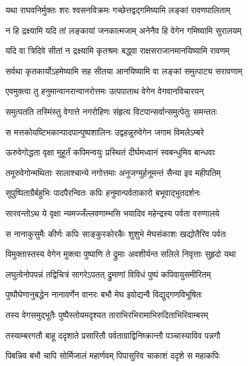 \twolineshloka
{यथा राघवनिर्मुक्तः शरः श्वसनविक्रमः}
{गच्छेत्तद्वद्गमिष्यामि लङ्कां रावणपालिताम्} %

\twolineshloka
{न हि द्रक्ष्यामि यदि तां लङ्कायां जनकात्मजाम्}
{अनेनैव हि वेगेन गमिष्यामि सुरालयम्} %

\twolineshloka
{यदि वा त्रिदिवे सीतां न द्रक्ष्यामि कृतश्रमः}
{बद्ध्वा राक्षसराजानमानयिष्यामि रावणम्} %

\twolineshloka
{सर्वथा कृतकार्योऽहमेष्यामि सह सीतया}
{आनयिष्यामि वा लङ्कां समुत्पाट्य सरावणाम्} %

\twolineshloka
{एवमुक्त्वा तु हनुमान्वानरान्वानरोत्तमः}
{उत्पपाताथ वेगेन वेगवानविचारयन्} %

\twolineshloka
{समुत्पतति तस्मिंस्तु वेगात्ते नगरोहिणः}
{संहृत्य विटपान्सर्वान्समुत्पेतुः समन्ततः} %

\twolineshloka
{स मत्तकोयष्टिभकान्पादपान्पुष्पशालिनः}
{उद्वहन्नूरुवेगेन जगाम विमलेऽम्बरे} %

\twolineshloka
{ऊरुवेगोद्धता वृक्षा मुहूर्तं कपिमन्वयुः}
{प्रस्थितं दीर्घमध्वानं स्वबन्धुमिव बान्धवाः} %

\twolineshloka
{तमूरुवेगोन्मथिताः सालाश्चान्ये नगोत्तमाः}
{अनुजग्मुर्हनूमन्तं सैन्या इव महीपतिम्} %

\twolineshloka
{सुपुष्पिताग्रैर्बहुभिः पादपैरन्वितः कपिः}
{हनुमान्पर्वताकारो बभूवाद्भुतदर्शनः} %

\twolineshloka
{सारवन्तोऽथ ये वृक्षा न्यमज्जँल्लवणाम्भसि}
{भयादिव महेन्द्रस्य पर्वता वरुणालये} %

\twolineshloka
{स नानाकुसुमैः कीर्णः कपिः साङ्कुरकोरकैः}
{शुशुभे मेघसंकाशः खद्योतैरिव पर्वतः} %

\twolineshloka
{विमुक्तास्तस्य वेगेन मुक्त्वा पुष्पाणि ते द्रुमाः}
{अवशीर्यन्त सलिले निवृत्ताः सुहृदो यथा} %

\twolineshloka
{लघुत्वेनोपपन्नं तद्विचित्रं सागरेऽपतत्}
{द्रुमाणां विविधं पुष्पं कपिवायुसमीरितम्} %

\twolineshloka
{पुष्पौघेणानुबद्धेन नानावर्णेन वानरः}
{बभौ मेघ इवोद्यन्वै विद्युद्गणविभूषितः} %

\twolineshloka
{तस्य वेगसमुद्भूतैः पुष्पैस्तोयमदृश्यत}
{ताराभिरभिरामाभिरुदिताभिरिवाम्बरम्} %

\twolineshloka
{तस्याम्बरगतौ बाहू ददृशाते प्रसारितौ}
{पर्वताग्राद्विनिष्क्रान्तौ पञ्चास्याविव पन्नगौ} %

\twolineshloka
{पिबन्निव बभौ चापि सोर्मिजालं महार्णवम्}
{पिपासुरिव चाकाशं ददृशे स महाकपिः} %

